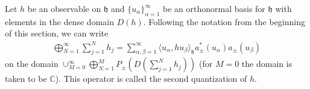 \begin{theorem}\cite[p.~38]{SolNotes}
	\label{thm:2nd-quantiztion-1}
	Let $h$ be an observable on $\mathfrak{h}$ and $\{u_\alpha\}_{\alpha=1}^\infty$
	be an orthonormal basis for $\mathfrak{h}$ with elements in the dense domain $D(h)$.
	Following the notation from the beginning of this section, we can write
	\begin{align*}
		\bigoplus_{N=1}^\infty\sum_{j=1}^N h_j =
		\sum_{\alpha,\beta=1}^\infty \langle u_\alpha,h u_\beta \rangle_\mathfrak{h} a^*_\pm(u_\alpha) a_\pm(u_\beta)
	\end{align*}
	on the domain $\cup_{M=0}^\infty\bigoplus_{N=1}^M P_\pm(D(\sum_{j=1}^N h_j))$ (for $M=0$
	the domain is taken to be $\mathbb{C}$). This operator is called the second quantization
	of $h$.
\end{theorem}
